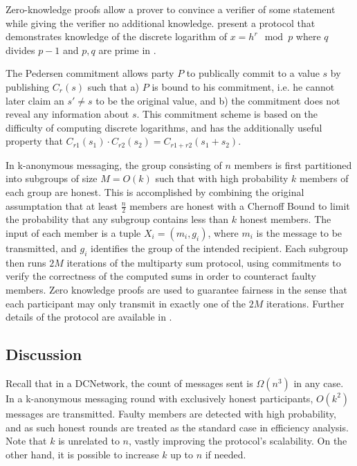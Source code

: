 Zero-knowledge proofs allow a prover to convince a verifier of some statement while
giving the verifier no additional knowledge. \citeauthor{chaum1987demonstrating}
present a protocol that demonstrates knowledge of the discrete logarithm of $x = h^r \mod p$
where $q$ divides $p - 1$ and $p,q$ are prime in \cite{chaum1987demonstrating}.

The Pedersen commitment \cite{pedersen1992non} allows party $P$ to publically commit
to a value $s$ by publishing $C_r(s)$ such that a) $P$ is bound to his commitment, i.e. he cannot later
claim an $s' \neq s$ to be the original value, and b) the commitment does not reveal
any information about $s$. This commitment scheme is based on the difficulty of computing discrete
logarithms, and has the additionally useful property that $C_{r1}(s_1) \cdot C_{r2}(s_2) = C_{r1 + r2}(s_1 + s_2)$.

In k-anonymous messaging, the group consisting of $n$ members is first partitioned
into subgroups of size $M = O(k)$ such that with high probability $k$ members of each group
are honest. This is accomplished by combining the original assumptation that at least
$\frac{n}{2}$ members are honest with a Chernoff Bound to limit the probability that
any subgroup contains less than $k$ honest members. The input of each member is
a tuple $X_i = (m_i, g_i)$, where $m_i$ is the message to be transmitted, and
$g_i$ identifies the group of the intended recipient. Each subgroup then runs
$2M$ iterations of the multiparty sum protocol, using commitments to verify the
correctness of the computed sums in order to counteract faulty members. Zero knowledge
proofs are used to guarantee fairness in the sense that each participant may only transmit
in exactly one of the $2M$ iterations. Further details of the protocol are available in
\cite{von2003k}.

\subsection{Discussion}

Recall that in a \ac{DCNetwork}, the count of messages sent is $\Omega(n^3)$ in any case.
In a k-anonymous messaging round with exclusively honest participants, $O(k^2)$ messages are transmitted.
Faulty members are detected with high probability, and as such
honest rounds are treated as the standard case in efficiency analysis.
Note that $k$ is unrelated to $n$, vastly improving the protocol's scalability.
On the other hand, it is possible to increase $k$ up to $n$ if needed.

